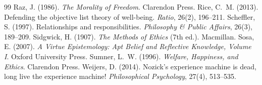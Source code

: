 \documentclass{situationist-preprint}
\begin{document}
\begin{thebibliography}{99}
 Raz, J. (1986). \emph{The Morality of Freedom}. Clarendon Press.
 Rice, C.~M. (2013). Defending the objective list theory of well-being. \emph{Ratio}, 26(2), 196--211.
 Scheffler, S. (1997). Relationships and responsibilities. \emph{Philosophy \& Public Affairs}, 26(3), 189--209.
 Sidgwick, H. (1907). \emph{The Methods of Ethics} (7th ed.). Macmillan.
 Sosa, E. (2007). \emph{A Virtue Epistemology: Apt Belief and Reflective Knowledge, Volume I}. Oxford University Press.
 Sumner, L.~W. (1996). \emph{Welfare, Happiness, and Ethics}. Clarendon Press.
 Weijers, D. (2014). Nozick's experience machine is dead, long live the experience machine! \emph{Philosophical Psychology}, 27(4), 513--535.
\end{thebibliography}
\end{document}
